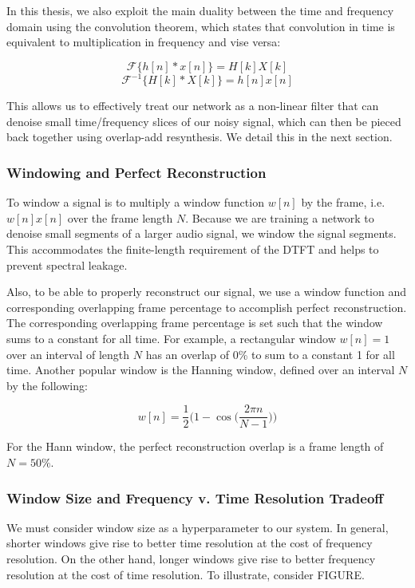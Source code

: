 In this thesis, we also exploit the main duality between the time and frequency domain using the convolution theorem, which states that convolution in time is equivalent to multiplication in frequency and vise versa:

\begin{equation}
\mathscr{F} \{h[n] * x[n]\} = H[k] X[k]
\end{equation}
\begin{equation}
\mathscr{F}^{-1} \{H[k] * X[k]\} = h[n] x[n]
\end{equation}

This allows us to effectively treat our network as a non-linear filter that can denoise small time/frequency slices of our noisy signal, which can then be pieced back together using overlap-add resynthesis. We detail this in the next section.

\subsubsection{Windowing and Perfect Reconstruction}
To window a signal is to multiply a window function $w[n]$ by the frame, i.e. $w[n]x[n]$ over the frame length $N$. Because we are training a network to denoise small segments of a larger audio signal, we window the signal segments. This accommodates the finite-length requirement of the DTFT and helps to prevent spectral leakage. \cite{alan1989discrete}

Also, to be able to properly reconstruct our signal, we use a window function and corresponding overlapping frame percentage to accomplish perfect reconstruction. The corresponding overlapping frame percentage is set such that the window sums to a constant for all time. For example, a rectangular window $w[n]=1$ over an interval of length $N$ has an overlap of 0\% to sum to a constant 1 for all time. Another popular window is the Hanning window, defined over an interval $N$ by the following:

\begin{equation}
w[n] = \dfrac{1}{2} \bigg( 1-\cos \bigg(\dfrac{2 \pi n}{N - 1} \bigg)\bigg)
\end{equation}

For the Hann window, the perfect reconstruction overlap is a frame length of $N=50\%$.

\subsubsection{Window Size and Frequency v. Time Resolution Tradeoff}
We must consider window size as a hyperparameter to our system. In general, shorter windows give rise to better time resolution at the cost of frequency resolution. On the other hand, longer windows give rise to better frequency resolution at the cost of time resolution. To illustrate, consider FIGURE.



